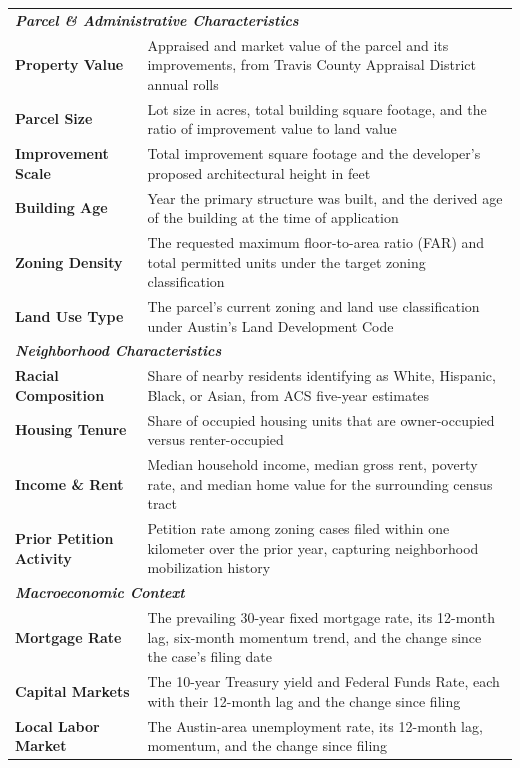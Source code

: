 \begin{longtable}{p{} p{}}
 \multicolumn{2}{l}{\textit{\textbf{Parcel \& Administrative Characteristics}}} \\[2pt]
 \textbf{Property Value} & Appraised and market value of the parcel and its improvements, from Travis County Appraisal District annual rolls \\
 \textbf{Parcel Size} & Lot size in acres, total building square footage, and the ratio of improvement value to land value \\
 \textbf{Improvement Scale} & Total improvement square footage and the developer's proposed architectural height in feet \\
 \textbf{Building Age} & Year the primary structure was built, and the derived age of the building at the time of application \\
 \textbf{Zoning Density} & The requested maximum floor-to-area ratio (FAR) and total permitted units under the target zoning classification \\
 \textbf{Land Use Type} & The parcel's current zoning and land use classification under Austin's Land Development Code \\
 \midrule
 \multicolumn{2}{l}{\textit{\textbf{Neighborhood Characteristics}}} \\[2pt]
 \textbf{Racial Composition} & Share of nearby residents identifying as White, Hispanic, Black, or Asian, from ACS five-year estimates \\
 \textbf{Housing Tenure} & Share of occupied housing units that are owner-occupied versus renter-occupied \\
 \textbf{Income \& Rent} & Median household income, median gross rent, poverty rate, and median home value for the surrounding census tract \\
 \textbf{Prior Petition Activity} & Petition rate among zoning cases filed within one kilometer over the prior year, capturing neighborhood mobilization history \\
 \midrule
 \multicolumn{2}{l}{\textit{\textbf{Macroeconomic Context}}} \\[2pt]
 \textbf{Mortgage Rate} & The prevailing 30-year fixed mortgage rate, its 12-month lag, six-month momentum trend, and the change since the case's filing date \\
 \textbf{Capital Markets} & The 10-year Treasury yield and Federal Funds Rate, each with their 12-month lag and the change since filing \\
 \textbf{Local Labor Market} & The Austin-area unemployment rate, its 12-month lag, momentum, and the change since filing \\
\end{longtable}
\endgroup
